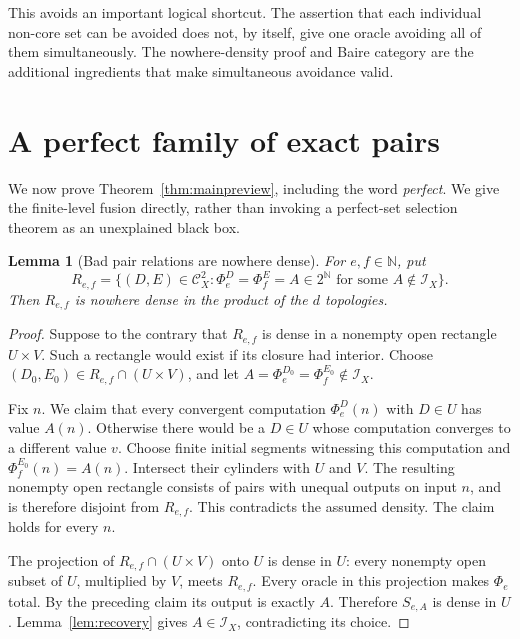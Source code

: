 \documentclass[11pt,a4paper]{article}
\newcommand{\N}{\mathbb N}
\newcommand{\Cantor}{2^{\N}}
\newcommand{\CD}{\mathcal C}
\newcommand{\core}{\mathcal I}
\newtheorem{lemma}[theorem]{Lemma}
\theoremstyle{definition}\newtheorem{definition}[theorem]{Definition}
\theoremstyle{remark}\newtheorem{remark}[theorem]{Remark}
\begin{document}
This avoids an important logical shortcut. The assertion that each individual
non-core set can be avoided does not, by itself, give one oracle avoiding all
of them simultaneously. The nowhere-density proof and Baire category are the
additional ingredients that make simultaneous avoidance valid.

\section{A perfect family of exact pairs}
\label{sec:perfect}
We now prove Theorem~\ref{thm:mainpreview}, including the word \emph{perfect}.
We give the finite-level fusion directly, rather than invoking a perfect-set
selection theorem as an unexplained black box.

\begin{lemma}[Bad pair relations are nowhere dense]\label{lem:badpairs}
For $e,f\in\N$, put
\[
 R_{e,f}=\{(D,E)\in\CD_X^2:
   \Phi_e^D=\Phi_f^E=A\in\Cantor\text{ for some }A\notin\core_X\}.
\]
Then $R_{e,f}$ is nowhere dense in the product of the $d$ topologies.
\end{lemma}
\begin{proof}
Suppose to the contrary that $R_{e,f}$ is dense in a nonempty open rectangle
$U\times V$. Such a rectangle would exist if its closure had interior.
Choose $(D_0,E_0)\in R_{e,f}\cap(U\times V)$, and let
$A=\Phi_e^{D_0}=\Phi_f^{E_0}\notin\core_X$.

Fix $n$. We claim that every convergent computation $\Phi_e^D(n)$ with $D\in U$
has value $A(n)$. Otherwise there would be a $D\in U$ whose computation
converges to a different value $v$. Choose finite initial segments witnessing
this computation and $\Phi_f^{E_0}(n)=A(n)$. Intersect their cylinders with
$U$ and $V$. The resulting nonempty open rectangle consists of pairs with
unequal outputs on input $n$, and is therefore disjoint from $R_{e,f}$. This
contradicts the assumed density. The claim holds for every $n$.

The projection of $R_{e,f}\cap(U\times V)$ onto $U$ is dense in $U$: every
nonempty open subset of $U$, multiplied by $V$, meets $R_{e,f}$. Every oracle
in this projection makes $\Phi_e$ total. By the preceding claim its output is
exactly $A$. Therefore $S_{e,A}$ is dense in $U$.
Lemma~\ref{lem:recovery} gives $A\in\core_X$, contradicting its choice.
\end{proof}
\end{document}
